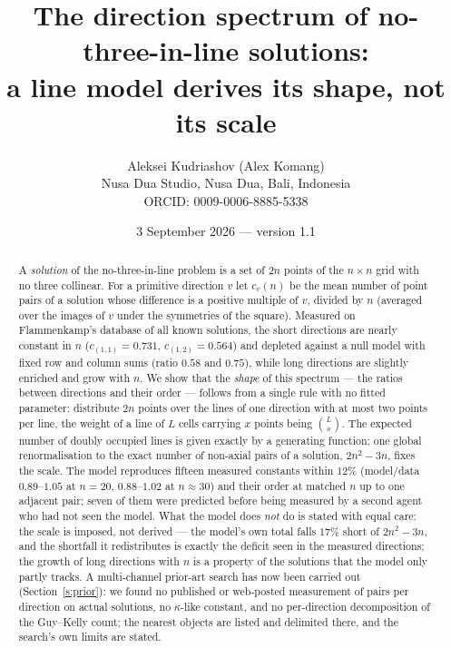\documentclass[11pt,a4paper]{article}
\title{The direction spectrum of no-three-in-line solutions:\\ a line model derives its shape, not its scale}
\author{Aleksei Kudriashov (Alex Komang)\\ \small Nusa Dua Studio, Nusa Dua, Bali, Indonesia\\ \small ORCID: 0009-0006-8885-5338}
\date{3 September 2026 --- version 1.1}
\begin{document}
\maketitle
\begin{abstract}
A \emph{solution} of the no-three-in-line problem is a set of $2n$ points of the $n\times n$ grid with no three
collinear.  For a primitive direction $v$ let $c_v(n)$ be the mean number of point pairs of a solution whose
difference is a positive multiple of $v$, divided by $n$ (averaged over the images of $v$ under the symmetries of
the square).  Measured on Flammenkamp's database of all known solutions, the short directions are nearly constant in
$n$ ($c_{(1,1)}=0.731$, $c_{(1,2)}=0.564$) and depleted against a null model with fixed row and column sums
(ratio $0.58$ and $0.75$), while long directions are slightly enriched and grow with $n$.  We show that the
\emph{shape} of this spectrum --- the ratios between directions and their order --- follows from a single rule with
no fitted parameter: distribute $2n$ points over the lines of one direction with at most two points per line, the
weight of a line of $L$ cells carrying $x$ points being $\binom{L}{x}$.  The expected number of doubly occupied lines
is given exactly by a generating function; one global renormalisation to the exact number of non-axial pairs of a
solution, $2n^2-3n$, fixes the scale.  The model reproduces fifteen measured constants within $12\%$ (model$/$data $0.89$--$1.05$ at $n=20$,
$0.88$--$1.02$ at $n\approx30$) and their order at matched $n$ up to one adjacent pair; seven of them were predicted before being measured by a second agent who had not seen the
model.  What the model does \emph{not} do is stated with equal care: the scale is imposed, not derived --- the
model's own total falls $17\%$ short of $2n^2-3n$, and the shortfall it redistributes is exactly the deficit seen in the
measured directions; the growth of long directions with $n$ is a property of the solutions that the model only
partly tracks.  A multi-channel prior-art search has now been carried out (Section~\ref{s:prior}): we found no published or
web-posted measurement of pairs per direction on actual solutions, no $\kappa$-like constant, and no per-direction
decomposition of the Guy--Kelly count; the nearest objects are listed and delimited there, and the search's own
limits are stated.
\end{abstract}
\end{document}
